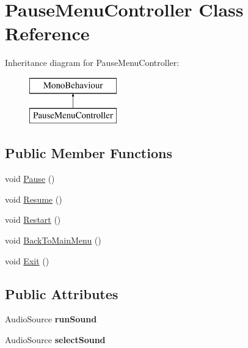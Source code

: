\hypertarget{class_pause_menu_controller}{}\section{Pause\+Menu\+Controller Class Reference}
\label{class_pause_menu_controller}
Inheritance diagram for Pause\+Menu\+Controller\+:\begin{figure}[H]
\begin{center}
\leavevmode
\includegraphics[height=2.000000cm]{class_pause_menu_controller}
\end{center}
\end{figure}
\subsection*{Public Member Functions}
\begin{DoxyCompactItemize}
\item 
void \mbox{\hyperlink{class_pause_menu_controller_a3906c8f1f6638758d0ec23baa3920119}{Pause}} ()
\item 
void \mbox{\hyperlink{class_pause_menu_controller_a4048ec517af3d52f890c2f6153287779}{Resume}} ()
\item 
void \mbox{\hyperlink{class_pause_menu_controller_a6589e248ee8b466d85c042144e88ab20}{Restart}} ()
\item 
void \mbox{\hyperlink{class_pause_menu_controller_afaeaff398ebcdab19e5eb124f8084764}{Back\+To\+Main\+Menu}} ()
\item 
void \mbox{\hyperlink{class_pause_menu_controller_a593d9304ba80dcc10449b5e9d612b67c}{Exit}} ()
\end{DoxyCompactItemize}
\subsection*{Public Attributes}
\begin{DoxyCompactItemize}
\item 
\mbox{\label{class_pause_menu_controller_abeaf61458f443fb71204f5b622b4f1da}} 
Audio\+Source {\bfseries run\+Sound}
\item 
\mbox{\label{class_pause_menu_controller_a870fbee8293cbe66136f77a30a9b782c}} 
Audio\+Source {\bfseries select\+Sound}
\end{DoxyCompactItemize}
